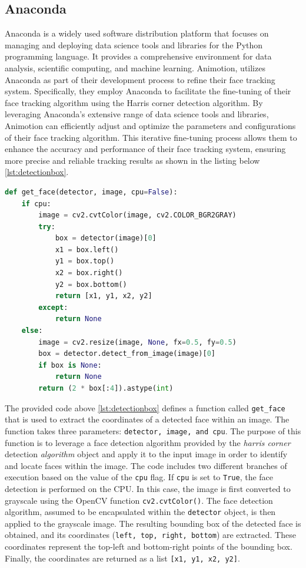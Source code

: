 \subsection{Anaconda}
Anaconda is a widely used software distribution platform that focuses on managing and deploying 
data science tools and libraries for the Python programming language. It provides a comprehensive environment 
for data analysis, scientific computing, and machine learning. \cite{anaconda}
Animotion, utilizes Anaconda as part of their development process to refine their face tracking system. 
Specifically, they employ Anaconda to facilitate the fine-tuning of their face tracking algorithm 
using the Harris corner detection algorithm.
By leveraging Anaconda's extensive range of data science tools and libraries, Animotion can 
efficiently adjust and optimize the parameters and configurations of their face tracking algorithm. 
This iterative fine-tuning process allows them to enhance the accuracy and performance of their face tracking system, 
ensuring more precise and reliable tracking results as shown in the listing below \ref{lst:detectionbox}. 

\begin{lstlisting}[language=Python,caption=Detecting the face in a box shaped object,label=lst:detectionbox]
    def get_face(detector, image, cpu=False):
    if cpu:
        image = cv2.cvtColor(image, cv2.COLOR_BGR2GRAY)
        try:
            box = detector(image)[0]
            x1 = box.left()
            y1 = box.top()
            x2 = box.right()
            y2 = box.bottom()
            return [x1, y1, x2, y2]
        except:
            return None
    else:
        image = cv2.resize(image, None, fx=0.5, fy=0.5)
        box = detector.detect_from_image(image)[0]
        if box is None:
            return None
        return (2 * box[:4]).astype(int)
\end{lstlisting}

The provided code above \ref{lst:detectionbox} defines a function called \texttt{get\_face} that is used to extract the coordinates of a detected face within an image. 
The function takes three parameters: \texttt{detector, image, and cpu}.
The purpose of this function is to leverage a face detection algorithm provided 
by the \emph{harris corner} detection \emph{algorithm} object and apply it to the input image in order to identify 
and locate faces within the image. The code includes two different branches of execution based on the value of the \texttt{cpu} flag.
If \texttt{cpu} is set to \texttt{True}, the face detection is performed on the CPU. 
In this case, the image is first converted to grayscale using the OpenCV function \texttt{cv2.cvtColor()}. 
The face detection algorithm, assumed to be encapsulated within the \texttt{detector} object, is then applied to the grayscale image. 
The resulting bounding box of the detected face is obtained, and its coordinates (\texttt{left, top, right, bottom}) are extracted. 
These coordinates represent the top-left and bottom-right points of the bounding box. Finally, the coordinates are returned as a list \texttt{[x1, y1, x2, y2]}.

